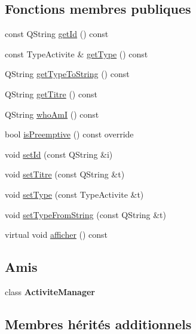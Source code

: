 \subsection*{Fonctions membres publiques}
\begin{DoxyCompactItemize}
\item 
const Q\+String \hyperlink{class_activite_a3590379c3a3ca9576daf546839f7bd8b}{get\+Id} () const 
\item 
const Type\+Activite \& \hyperlink{class_activite_a95c674ca8775241901bc43112b253bd2}{get\+Type} () const 
\item 
Q\+String \hyperlink{class_activite_a00ba08913dad4b7e6cd47016b1ae1e83}{get\+Type\+To\+String} () const 
\item 
Q\+String \hyperlink{class_activite_a81a06135fa07489e7ed8d9363510467e}{get\+Titre} () const 
\item 
Q\+String \hyperlink{class_activite_a82dd41b3ab9c2d00848d88ea8d985743}{who\+Am\+I} () const 
\item 
bool \hyperlink{class_activite_a2d5539913a03522aa2244cf091d05aab}{is\+Preemptive} () const override
\item 
void \hyperlink{class_activite_a86514a48976df542b3ff15b1bf35003e}{set\+Id} (const Q\+String \&i)
\item 
void \hyperlink{class_activite_a8d708867c97f1eea188dce47e56ddf40}{set\+Titre} (const Q\+String \&t)
\item 
void \hyperlink{class_activite_a4fa019070cce66fbd8bcd8667a70480d}{set\+Type} (const Type\+Activite \&t)
\item 
void \hyperlink{class_activite_a519fc19bc5051e236631e14e3d564ed2}{set\+Type\+From\+String} (const Q\+String \&t)
\item 
virtual void \hyperlink{class_activite_a7643c2d88519c174143318cf8f813dc0}{afficher} () const 
\end{DoxyCompactItemize}
\subsection*{Amis}
\begin{DoxyCompactItemize}
\item 
\hypertarget{class_activite_a3e1acfebc533ba2365df5d04515154dd}{}class {\bfseries Activite\+Manager}\label{class_activite_a3e1acfebc533ba2365df5d04515154dd}

\end{DoxyCompactItemize}
\subsection*{Membres hérités additionnels}


